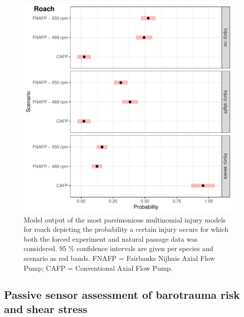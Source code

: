 \documentclass[fleqn,10pt]{wlscirep}
\begin{document}
\begin{figure}[ht]
  \centering
  \includegraphics[scale=0.5]{mult_model_bream_roach_eel_length_natural}
  \caption{Model output of the most parsimonious multinomial injury models for roach depicting the probability a certain injury occurs for which both the forced experiment and natural passage data was considered. 95 \% confidence intervals are given per species and scenario as red bands. FNAFP = Fairbanks Nijhuis Axial Flow Pump; CAFP = Conventional Axial Flow Pump.}
  \label{fig:mult_model_bream_roach_eel_length_natural}
\end{figure}

\subsection*{Passive sensor assessment of barotrauma risk and shear stress}
\end{document}
